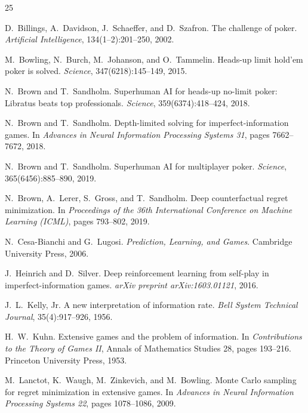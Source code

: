 \begin{thebibliography}{25}
\small
\setlength{\itemsep}{2pt}

D.~Billings, A.~Davidson, J.~Schaeffer, and D.~Szafron.
\newblock The challenge of poker.
\newblock \emph{Artificial Intelligence}, 134(1--2):201--250, 2002.

M.~Bowling, N.~Burch, M.~Johanson, and O.~Tammelin.
\newblock Heads-up limit hold'em poker is solved.
\newblock \emph{Science}, 347(6218):145--149, 2015.

N.~Brown and T.~Sandholm.
\newblock Superhuman AI for heads-up no-limit poker: Libratus beats top professionals.
\newblock \emph{Science}, 359(6374):418--424, 2018.

N.~Brown and T.~Sandholm.
\newblock Depth-limited solving for imperfect-information games.
\newblock In \emph{Advances in Neural Information Processing Systems 31}, pages 7662--7672, 2018.

N.~Brown and T.~Sandholm.
\newblock Superhuman AI for multiplayer poker.
\newblock \emph{Science}, 365(6456):885--890, 2019.

N.~Brown, A.~Lerer, S.~Gross, and T.~Sandholm.
\newblock Deep counterfactual regret minimization.
\newblock In \emph{Proceedings of the 36th International Conference on Machine Learning (ICML)}, pages 793--802, 2019.

N.~Cesa-Bianchi and G.~Lugosi.
\newblock \emph{Prediction, Learning, and Games}.
\newblock Cambridge University Press, 2006.

J.~Heinrich and D.~Silver.
\newblock Deep reinforcement learning from self-play in imperfect-information games.
\newblock \emph{arXiv preprint arXiv:1603.01121}, 2016.

J.~L.~Kelly, Jr.
\newblock A new interpretation of information rate.
\newblock \emph{Bell System Technical Journal}, 35(4):917--926, 1956.

H.~W.~Kuhn.
\newblock Extensive games and the problem of information.
\newblock In \emph{Contributions to the Theory of Games II}, Annals of Mathematics Studies 28, pages 193--216. Princeton University Press, 1953.

M.~Lanctot, K.~Waugh, M.~Zinkevich, and M.~Bowling.
\newblock Monte Carlo sampling for regret minimization in extensive games.
\newblock In \emph{Advances in Neural Information Processing Systems 22}, pages 1078--1086, 2009.


\end{thebibliography}
